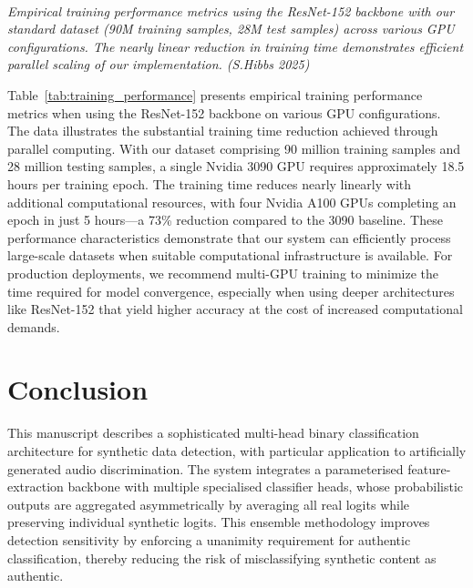 \documentclass[conference]{IEEEtran}  %
\begin{document}
\begin{table}[t]
\centering
\caption{Training Performance with ResNet-152 on Various GPU Configurations}
\label{tab:training_performance}
\\[\baselineskip]
{\footnotesize \textit{Empirical training performance metrics using the ResNet-152 backbone with our standard dataset (90M training samples, 28M test samples) across various GPU configurations. The nearly linear reduction in training time demonstrates efficient parallel scaling of our implementation. (S.Hibbs 2025)}}
\end{table}

Table~\ref{tab:training_performance} presents empirical training performance metrics when using the ResNet-152 backbone on various GPU configurations. The data illustrates the substantial training time reduction achieved through parallel computing. With our dataset comprising 90 million training samples and 28 million testing samples, a single Nvidia 3090 GPU requires approximately 18.5 hours per training epoch. The training time reduces nearly linearly with additional computational resources, with four Nvidia A100 GPUs completing an epoch in just 5 hours—a 73\% reduction compared to the 3090 baseline. These performance characteristics demonstrate that our system can efficiently process large-scale datasets when suitable computational infrastructure is available. For production deployments, we recommend multi-GPU training to minimize the time required for model convergence, especially when using deeper architectures like ResNet-152 that yield higher accuracy at the cost of increased computational demands.


\section{Conclusion}
This manuscript describes a sophisticated multi-head binary classification architecture for synthetic data detection, with particular application to artificially generated audio discrimination. The system integrates a parameterised feature-extraction backbone with multiple specialised classifier heads, whose probabilistic outputs are aggregated asymmetrically by averaging all real logits while preserving individual synthetic logits. This ensemble methodology improves detection sensitivity by enforcing a unanimity requirement for authentic classification, thereby reducing the risk of misclassifying synthetic content as authentic.
\end{document}
